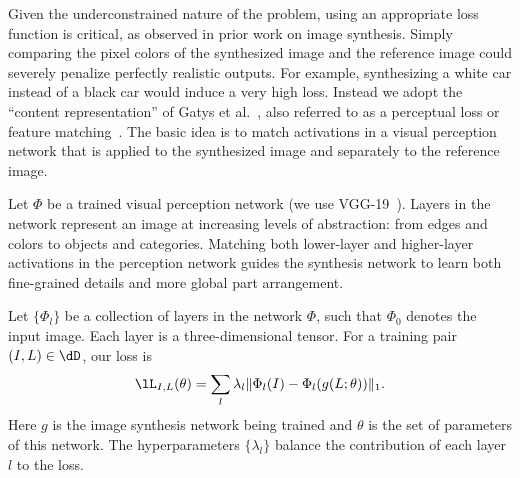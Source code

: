 Given the underconstrained nature of the problem, using an appropriate loss function is critical, as observed in prior work on image synthesis. Simply comparing the pixel colors of the synthesized image and the reference image could severely penalize perfectly realistic outputs. For example, synthesizing a white car instead of a black car would induce a very high loss. Instead we adopt the ``content representation'' of Gatys et al.~\cite{Gatys2016}, also referred to as a perceptual loss or feature matching~\cite{Bruna2016,DosovitskiyBrox2016,Johnson2016,Ledig2016,Nguyen2016,Nguyen2017}. The basic idea is to match activations in a visual perception network that is applied to the synthesized image and separately to the reference image.

Let $\Phi$ be a trained visual perception network (we use VGG-19~\cite{SimonyanZisserman2015}). Layers in the network represent an image at increasing levels of abstraction: from edges and colors to objects and categories.
Matching both lower-layer and higher-layer activations in the perception network guides the synthesis network to learn both fine-grained details and more global part arrangement.

Let $\{\Phi_l\}$ be a collection of layers in the network $\Phi$, such that $\Phi_0$ denotes the input image. Each layer is a three-dimensional tensor.
For a training pair ${(I,L) \in \dD}$, our loss is
\begin{equation}
\lL_{I,L}(\theta) = \sum_l{\lambda_l\| \Phi_l(I)-\Phi_l(g(L;\theta))\|_1}.
\label{eq:loss}
\end{equation}
Here $g$ is the image synthesis network being trained and $\theta$ is the set of parameters of this network. The hyperparameters $\{\lambda_l\}$ balance the contribution of each layer $l$ to the loss.


